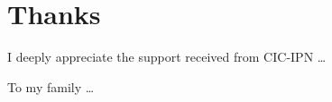 % 
\cleardoublepage
\section*{Thanks}
{\noindent
\textsf{I deeply appreciate the support received from CIC-IPN \ldots%
}} 
\begin{center}
\textsf{To my family \ldots}
\end{center}
\pagebreak
